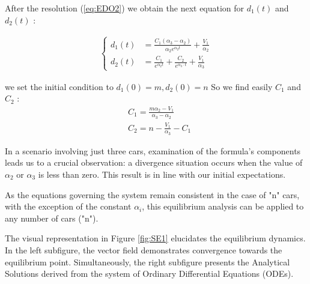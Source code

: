 \documentclass{article}
\begin{document}
		After the resolution (\ref{eq:EDO2}) we obtain the next equation for $d_1(t)$ and $d_2(t)$ : 
		
		\begin{align*}
			\begin{cases}
				d_1(t) &= \frac{C_1(\alpha_3-\alpha_2)}{\alpha_2e^{\alpha_2t}}+ \frac{V_1}{\alpha_2}\\
				d_2(t) &= \frac{C_1}{e^{\alpha_2t}} + \frac{C_2}{e^{\alpha_3 \cdot t}} + \frac{V_1}{\alpha_3}
			\end{cases}
		\end{align*}
		
		we set the initial condition to $d_1(0)=m, d_2(0)=n$ So we find easily $C_1$ and $C_2$ : 
		\begin{align*}
			&C_1=\frac{m\alpha_2-V_1}{\alpha_3-\alpha_2} \\
			&C_2=n-\frac{V_1}{\alpha_3} - C_1
		\end{align*}
		
		In a scenario involving just three cars, examination of the formula's components leads us to a crucial observation: a divergence situation occurs when the value of $\alpha_2$ or $\alpha_3$ is less than zero. This result is in line with our initial expectations.
		
		As the equations governing the system remain consistent in the case of "n" cars, with the exception of the constant $\alpha_i$, this equilibrium analysis can be applied to any number of cars ("n").
		
		The visual representation in Figure \ref{fig:SE1} elucidates the equilibrium dynamics. In the left subfigure, the vector field demonstrates convergence towards the equilibrium point. Simultaneously, the right subfigure presents the Analytical Solutions derived from the system of Ordinary Differential Equations (ODEs).
		
\end{document}
